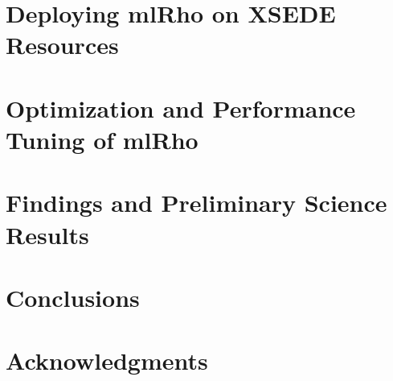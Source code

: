 \documentclass{sig-alternate}
\begin{document}
%
%
%
%

\section{Deploying mlRho on XSEDE Resources}\label{sec:resources}

\section{Optimization and Performance Tuning of mlRho}\label{sec:optimization}

\section{Findings and Preliminary Science Results}\label{sec:results}

\section{Conclusions}\label{sec:conclusion}



\section{Acknowledgments}
%

%
%
\end{document}
